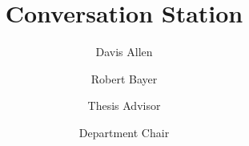 \documentclass{scu-thesis}
\author{Davis Allen}
\author{Robert Bayer}
\title{Conversation Station}
\begin{document}
\frontmatter
\signature{Thesis Advisor}
\signature{Department Chair}

\maketitle


\tableofcontents
\listoffigures

\mainmatter
















\backmatter
\end{document}
